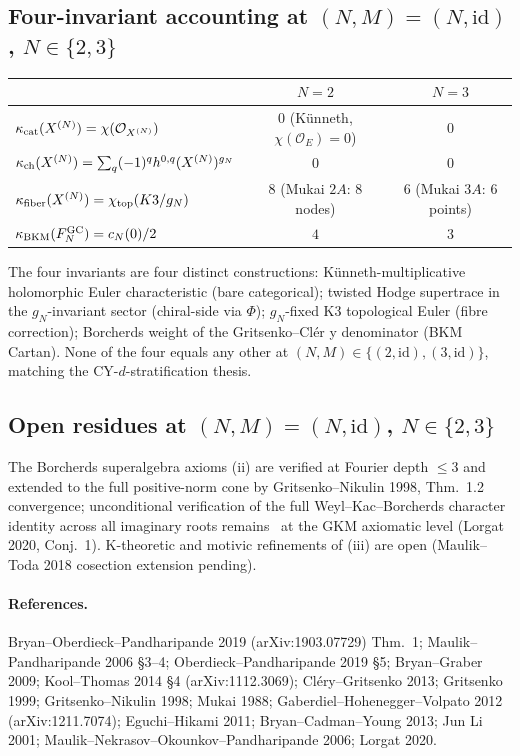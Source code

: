 \subsection*{Four-invariant accounting at $(N, M) = (N, \mathrm{id})$, $N \in \{2, 3\}$}

\begin{center}
\begin{tabular}{lcc}
\toprule
 & $N = 2$ & $N = 3$ \\
\midrule
$\kappa_{\mathrm{cat}}(X^{(N)}) = \chi(\mathcal{O}_{X^{(N)}})$
  & $0$ (K\"unneth, $\chi(\mathcal{O}_E) = 0$) & $0$ \\
$\kappa_{\mathrm{ch}}(X^{(N)}) = \sum_q (-1)^q h^{0,q}(X^{(N)})^{g_N}$
  & $0$ & $0$ \\
$\kappa_{\mathrm{fiber}}(X^{(N)}) = \chi_{\mathrm{top}}(K3/g_N)$
  & $8$ (Mukai $2A$: $8$ nodes) & $6$ (Mukai $3A$: $6$ points) \\
$\kappa_{\mathrm{BKM}}(F^{\mathrm{GC}}_N) = c_N(0)/2$
  & $4$ & $3$ \\
\bottomrule
\end{tabular}
\end{center}

The four invariants are four distinct constructions: Künneth-multiplicative
holomorphic Euler characteristic (bare categorical); twisted Hodge supertrace
in the $g_N$-invariant sector (chiral-side via $\Phi$); $g_N$-fixed K3
topological Euler (fibre correction); Borcherds weight of the
Gritsenko--Clér y denominator (BKM Cartan). None of the four equals any
other at $(N, M) \in \{(2, \mathrm{id}), (3, \mathrm{id})\}$, matching the
CY-$d$-stratification thesis.

\subsection*{Open residues at $(N, M) = (N, \mathrm{id})$, $N \in \{2, 3\}$}

The Borcherds superalgebra axioms (ii) are verified at Fourier depth
$\le 3$ and extended to the full positive-norm cone by
Gritsenko--Nikulin 1998, Thm.~1.2 convergence; unconditional
verification of the full Weyl--Kac--Borcherds character identity across
all imaginary roots remains \ClaimStatusConjectured\ at the GKM axiomatic
level (Lorgat 2020, Conj.~1). K-theoretic and motivic refinements of (iii)
are open (Maulik--Toda 2018 cosection extension pending).

\paragraph{References.} Bryan--Oberdieck--Pandharipande 2019
(arXiv:1903.07729) Thm.~1; Maulik--Pandharipande 2006 \S 3--4;
Oberdieck--Pandharipande 2019 \S 5; Bryan--Graber 2009;
Kool--Thomas 2014 \S 4 (arXiv:1112.3069); Cl\'ery--Gritsenko 2013;
Gritsenko 1999; Gritsenko--Nikulin 1998; Mukai 1988;
Gaberdiel--Hohenegger--Volpato 2012 (arXiv:1211.7074);
Eguchi--Hikami 2011; Bryan--Cadman--Young 2013; Jun Li 2001;
Maulik--Nekrasov--Okounkov--Pandharipande 2006; Lorgat 2020.
